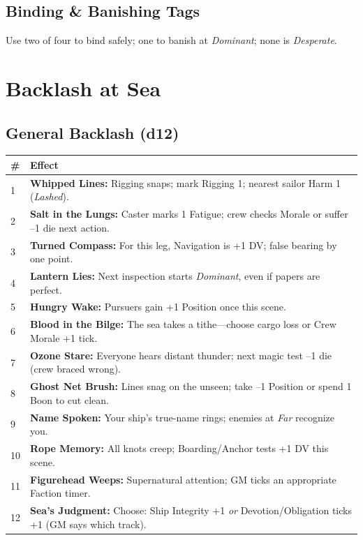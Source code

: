 \documentclass[11pt,oneside]{book}
\newcommand{\tagpill}[1]{\begingroup
  \setlength{\fboxsep}{1pt}\color{black}\fbox{\footnotesize\textsf{#1}}
\endgroup}
\begin{document}
\subsection*{Binding \& Banishing Tags}
Use two of four to bind safely; one to banish at \emph{Dominant}; none is \emph{Desperate}. \tagpill{SALT} \tagpill{IRON} \tagpill{KNOT} \tagpill{NAME}

\section{Backlash at Sea}

\subsection*{General Backlash (d12)}
\begin{tabularx}{\linewidth}{@{}p{0.7cm} X@{}}
\toprule
\# & \textbf{Effect}\\
\midrule
1 & \textbf{Whipped Lines:} Rigging snaps; mark Rigging 1; nearest sailor Harm 1 (\emph{Lashed}).\\
2 & \textbf{Salt in the Lungs:} Caster marks 1 Fatigue; crew checks Morale or suffer --1 die next action.\\
3 & \textbf{Turned Compass:} For this leg, Navigation is +1 DV; false bearing by one point.\\
4 & \textbf{Lantern Lies:} Next inspection starts \emph{Dominant}, even if papers are perfect.\\
5 & \textbf{Hungry Wake:} Pursuers gain +1 Position once this scene.\\
6 & \textbf{Blood in the Bilge:} The sea takes a tithe---choose cargo loss or Crew Morale +1 tick.\\
7 & \textbf{Ozone Stare:} Everyone hears distant thunder; next magic test --1 die (crew braced wrong).\\
8 & \textbf{Ghost Net Brush:} Lines snag on the unseen; take --1 Position or spend 1 Boon to cut clean.\\
9 & \textbf{Name Spoken:} Your ship's true-name rings; enemies at \emph{Far} recognize you.\\
10 & \textbf{Rope Memory:} All knots creep; Boarding/Anchor tests +1 DV this scene.\\
11 & \textbf{Figurehead Weeps:} Supernatural attention; GM ticks an appropriate Faction timer.\\
12 & \textbf{Sea's Judgment:} Choose: Ship Integrity +1 \emph{or} Devotion/Obligation ticks +1 (GM says which track).\\
\bottomrule
\end{tabularx}
\end{document}
